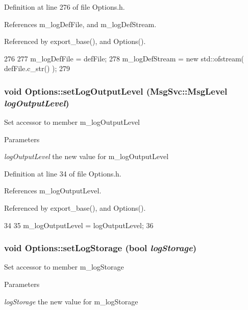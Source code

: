Definition at line 276 of file Options.h.

References m\_\-logDefFile, and m\_\-logDefStream.

Referenced by export\_\-base(), and Options().


\begin{DoxyCode}
276                                                {
277                 m_logDefFile = defFile;
278                 m_logDefStream = new std::ofstream( defFile.c_str() );
279         }
\end{DoxyCode}
\hypertarget{classOptions_a5d8ab053c941a944a53c0bfe871058a1}{
\subsubsection[{setLogOutputLevel}]{\setlength{\rightskip}{0pt plus 5cm}void Options::setLogOutputLevel ({\bf MsgSvc::MsgLevel} {\em logOutputLevel})}}
\label{classOptions_a5d8ab053c941a944a53c0bfe871058a1}
Set accessor to member m\_\-logOutputLevel 
\begin{DoxyParams}{Parameters}
\item[{\em logOutputLevel}]the new value for m\_\-logOutputLevel \end{DoxyParams}


Definition at line 34 of file Options.h.

References m\_\-logOutputLevel.

Referenced by export\_\-base(), and Options().


\begin{DoxyCode}
34                                                                {
35                 m_logOutputLevel = logOutputLevel;
36         }
\end{DoxyCode}
\hypertarget{classOptions_a96f0288f5317cf371589f4db07e913b0}{
\subsubsection[{setLogStorage}]{\setlength{\rightskip}{0pt plus 5cm}void Options::setLogStorage (bool {\em logStorage})}}
\label{classOptions_a96f0288f5317cf371589f4db07e913b0}
Set accessor to member m\_\-logStorage 
\begin{DoxyParams}{Parameters}
\item[{\em logStorage}]the new value for m\_\-logStorage \end{DoxyParams}


